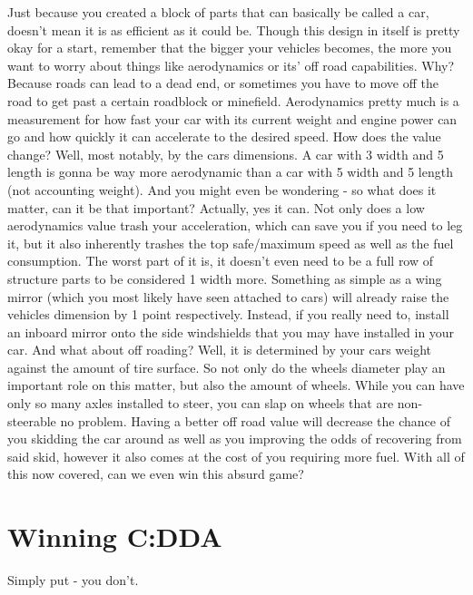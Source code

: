 \documentclass[11pt]{report}
\begin{document}
Just because you created a block of parts that can basically be called a car, doesn't mean it is as efficient as it could be. Though this design in itself is pretty okay for a start, remember that the bigger your vehicles becomes, the more you want to worry about things like aerodynamics or its' off road capabilities. Why? Because roads can lead to a dead end, or sometimes you have to move off the road to get past a certain roadblock or minefield. Aerodynamics pretty much is a measurement for how fast your car with its current weight and engine power can go and how quickly it can accelerate to the desired speed. How does the value change? Well, most notably, by the cars dimensions. A car with 3 width and 5 length is gonna be way more aerodynamic than a car with 5 width and 5 length (not accounting weight). And you might even be wondering - so what does it matter, can it be that important? Actually, yes it can. Not only does a low aerodynamics value trash your acceleration, which can save you if you need to leg it, but it also inherently trashes the top safe/maximum speed as well as the fuel consumption. The worst part of it is, it doesn't even need to be a full row of structure parts to be considered 1 width more. Something as simple as a wing mirror (which you most likely have seen attached to cars) will already raise the vehicles dimension by 1 point respectively. Instead, if you really need to, install an inboard mirror onto the side windshields that you may have installed in your car. And what about off roading? Well, it is determined by your cars weight against the amount of tire surface. So not only do the wheels diameter play an important role on this matter, but also the amount of wheels. While you can have only so many axles installed to steer, you can slap on wheels that are non-steerable no problem.
Having a better off road value will decrease the chance of you skidding the car around as well as you improving the odds of recovering from said skid, however it also comes at the cost of you requiring more fuel.
With all of this now covered, can we even win this absurd game?

\section{Winning C:DDA}

Simply put - you don't.
\end{document}
